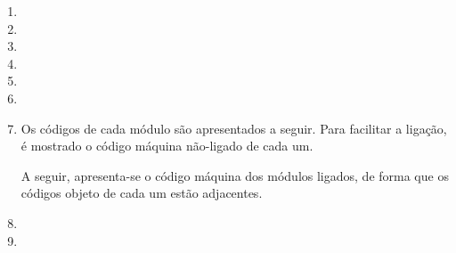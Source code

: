 \begin{enumerate}
    \item
    \item
    \item

    \item 
    
    \item
    \item

    \item
    Os códigos de cada módulo são apresentados a seguir.
    Para facilitar a ligação, é mostrado 
    o código máquina não-ligado de cada um.

    A seguir, apresenta-se o código máquina dos módulos ligados,
    de forma que os códigos objeto de cada um estão adjacentes.

    \item
    \item
\end{enumerate}